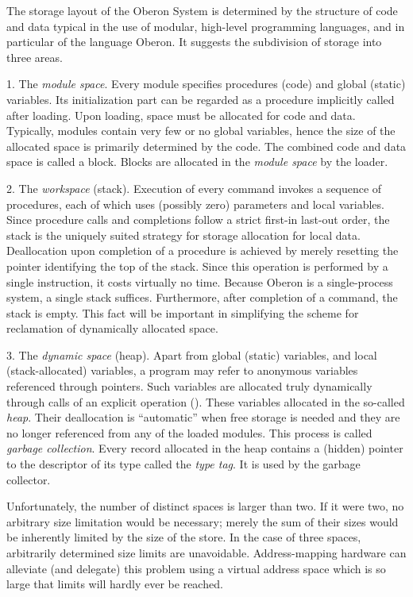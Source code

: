 The storage layout of the Oberon System is determined by the structure of code and data typical in the use of modular, high-level programming languages, and in particular of the language Oberon. It suggests the subdivision of storage into three areas.

1. The \emph{module space}. Every module specifies procedures (code) and global (static) variables. Its initialization part can be regarded as a procedure implicitly called after loading. Upon loading, space must be allocated for code and data. Typically, modules contain very few or no global variables, hence the size of the allocated space is primarily determined by the code. The combined code and data space is called a block. Blocks are allocated in the \emph{module space} by the loader.

2. The \emph{workspace} (stack). Execution of every command invokes a sequence of procedures, each of which uses (possibly zero) parameters and local variables. Since procedure calls and completions follow a strict first-in last-out order, the stack is the uniquely suited strategy for storage allocation for local data. Deallocation upon completion of a procedure is achieved by merely resetting the pointer identifying the top of the stack. Since this operation is performed by a single instruction, it costs virtually no time. Because Oberon is a single-process system, a single stack suffices. Furthermore, after completion of a command, the stack is empty. This fact will be important in simplifying the scheme for reclamation of dynamically allocated space.

3. The \emph{dynamic space} (heap). Apart from global (static) variables, and local (stack-allocated) variables, a program may refer to anonymous variables referenced through pointers. Such variables are allocated truly dynamically through calls of an explicit operation (). These variables  allocated in the so-called \emph{heap}. Their deallocation is ``automatic'' when free storage is needed and they are no longer referenced from any of the loaded modules. This process is called \emph{garbage collection}. Every record allocated in the heap contains a (hidden) pointer to the descriptor of its type called the \emph{type tag}. It is used by the garbage collector.

Unfortunately, the number of distinct spaces is larger than two. If it were two, no arbitrary size limitation would be necessary; merely the sum of their sizes would be inherently limited by the size of the store. In the case of three spaces, arbitrarily determined size limits are unavoidable. Address-mapping hardware can alleviate (and delegate) this problem using a virtual address space which is so large that limits will hardly ever be reached.

